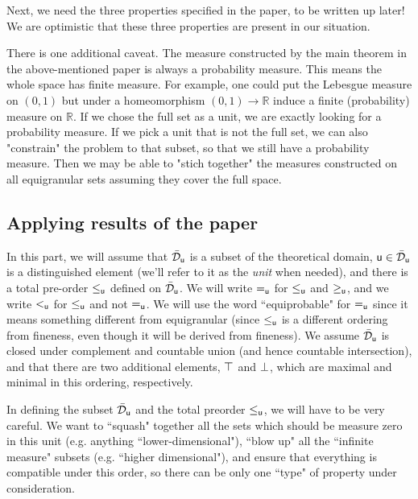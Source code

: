 \documentclass[10pt, onecolumn, nofootinbib]{revtex4-2}
\begin{document}
Next, we need the three properties specified in the paper, to be written up later! We are optimistic that these three properties are present in our situation. 

There is one additional caveat. The measure constructed by the main theorem in the above-mentioned paper is always a probability measure. This means the whole space has finite measure. For example, one could put the Lebesgue measure on $(0,1)$ but under a homeomorphism $(0,1)\to\mathbb{R}$ induce a finite (probability) measure on  $\mathbb{R}$. If we chose the full set as a unit, we are exactly looking for a probability measure. If we pick a unit that is not the full set, we can also "constrain" the problem to that subset, so that we still have a probability measure. Then we may be able to "stich together" the measures constructed on all equigranular sets assuming they cover the full space. 

\subsection{Applying results of the paper \cite{villegas}}

In this part, we will assume that $\tdomain_{\stmt[u]}$ is a subset of the theoretical domain, $\stmt[u]\in \tdomain_{\stmt[u]}$ is a distinguished element (we'll refer to it as the \emph{unit} when needed), and there is a total pre-order $\leq_{\stmt[u]}$ defined on $\tdomain_{\stmt[u]}$. We will write $=_{\stmt[u]}$ for $\leq_{\stmt[u]}$ and $\geq_{\stmt[u]}$, and we write $<_{\stmt[u]}$ for $\leq_{\stmt[u]}$ and not $=_{\stmt[u]}$. We will use the word ``equiprobable" for $=_{\stmt[u]}$ since it means something different from equigranular (since $\leq_{\stmt[u]}$ is a different ordering from fineness, even though it will be derived from fineness). We assume $\tdomain_{\stmt[u]}$ is closed under complement and countable union (and hence countable intersection), and that there are two additional elements, $\certainty$ and $\impossibility$, which are maximal and minimal in this ordering, respectively.

\begin{remark}
In defining the subset $\tdomain_{\stmt[u]}$ and the total preorder $\leq_{\stmt[u]}$, we will have to be very careful. We want to ``squash" together all the sets which should be measure zero in this unit (e.g. anything ``lower-dimensional"), ``blow up" all the ``infinite measure" subsets (e.g. ``higher dimensional"), and ensure that everything is compatible under this order, so there can be only one ``type" of property under consideration. 
\end{remark}
\end{document}
